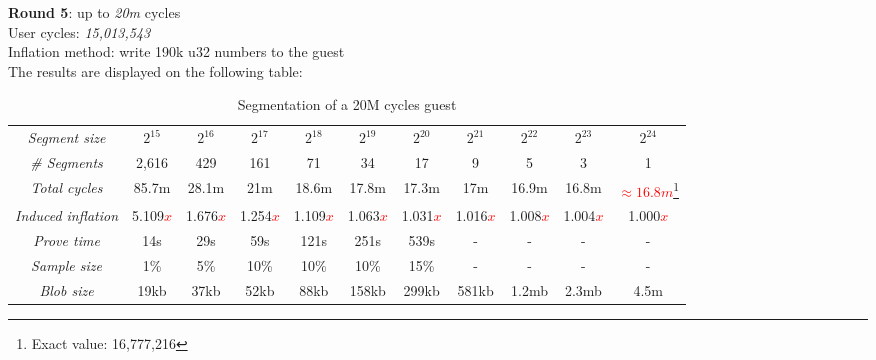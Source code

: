 \documentclass[a4paper, 10pt]{article}
\begin{document}
\par \noindent
\textbf{Round 5}: up to \textit{20m} cycles\\
User cycles: \textit{15,013,543}\\
Inflation method: write 190k u32 numbers to the guest\\
The results are displayed on the following table:
\begin{table}[H]
  	\begin{center}
    \label{tab:table6}
    \begin{minipage}{\textwidth}
    \begin{adjustbox}{width=\textwidth}
    \begin{tabular}{c|c|c|c|c|c|c|c|c|c|c}
	  \textit{Segment size} & $2^{15}$ & $2^{16}$ & $2^{17}$ & $2^{18}$ & $2^{19}$ & $2^{20}$ & $2^{21}$ & $2^{22}$ & $2^{23}$ & $2^{24}$\\
	  \textit{\# Segments} & 2,616 & 429 & 161 & 71 & 34 & 17 & 9 & 5 & 3 & 1\\
	  \textit{Total cycles} & 85.7m & 28.1m & 21m & 18.6m & 17.8m & 17.3m & 17m & 16.9m & 16.8m & \textcolor{red}{$\approx 16.8m$}\footnote{Exact value: 16,777,216}\\
	  \textit{Induced inflation} & 5.109\textcolor{red}{$x$} & 1.676\textcolor{red}{$x$} & 1.254\textcolor{red}{$x$} & 1.109\textcolor{red}{$x$} & 1.063\textcolor{red}{$x$} & 1.031\textcolor{red}{$x$}  & 1.016\textcolor{red}{$x$} & 1.008\textcolor{red}{$x$} & 1.004\textcolor{red}{$x$} & 1.000\textcolor{red}{$x$}\\
	  \textit{Prove time} & 14s & 29s & 59s & 121s & 251s & 539s & - & - & - & -\\
	  \textit{Sample size} & 1\% & 5\% & 10\% & 10\% & 10\% & 15\% & - & - & - & -\\
	  \textit{Blob size} & 19kb & 37kb & 52kb & 88kb & 158kb & 299kb & 581kb & 1.2mb & 2.3mb & 4.5m\\
   	\end{tabular}
   	\end{adjustbox}
   	\end{minipage}
    \caption{Segmentation of a 20M cycles guest}
  \end{center}
\end{table}
\end{document}
